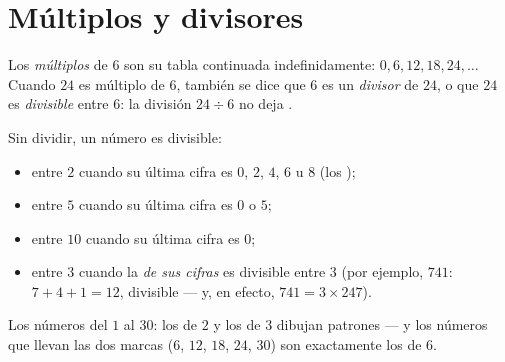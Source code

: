 \section{Múltiplos y divisores}

\begin{definition}\label{def:g5:division:multiple}
Los \emph{múltiplos} de $6$ son su tabla continuada
indefinidamente: $0, 6, 12, 18, 24, \dots$ Cuando $24$ es múltiplo de $6$,
también se dice que $6$ es un \emph{divisor} de $24$,
o que $24$ es \emph{divisible} entre $6$: la división
$24 \div 6$ no deja .
\end{definition}

\begin{proposition}\label{prop:g5:division:criteria}
Sin dividir, un número es divisible:
\begin{itemize}
  \item entre $2$ cuando su última cifra es $0$, $2$, $4$, $6$ u $8$
        (los );
  \item entre $5$ cuando su última cifra es $0$ o $5$;
  \item entre $10$ cuando su última cifra es $0$;
  \item entre $3$ cuando la \emph{ de sus cifras} es divisible entre
        $3$ (por ejemplo, $741$: $7 + 4 + 1 = 12$, divisible --- y, en efecto,
        $741 = 3 \times 247$).
\end{itemize}
\end{proposition}
\admitted

\begin{omfigure}

{\small Los números del $1$ al $30$: los  de $2$ y los de $3$ dibujan
patrones --- y los números que llevan las dos marcas ($6$, $12$, $18$,
$24$, $30$) son exactamente los  de $6$.}
\end{omfigure}

